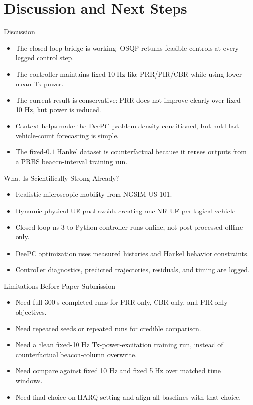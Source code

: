 \documentclass[aspectratio=1610,10pt]{beamer}
\begin{document}
\section{Discussion and Next Steps}

\begin{frame}{Discussion}
  \begin{itemize}
    \item The closed-loop bridge is working: OSQP returns feasible controls at every logged control step.
    \item The controller maintains fixed-10 Hz-like PRR/PIR/CBR while using lower mean Tx power.
    \item The current result is conservative: PRR does not improve clearly over fixed 10 Hz, but power is reduced.
    \item Context helps make the DeePC problem density-conditioned, but hold-last vehicle-count forecasting is simple.
    \item The fixed-$0.1$ Hankel dataset is counterfactual because it reuses outputs from a PRBS beacon-interval training run.
  \end{itemize}
\end{frame}

\begin{frame}{What Is Scientifically Strong Already?}
  \begin{itemize}
    \item Realistic microscopic mobility from NGSIM US-101.
    \item Dynamic physical-UE pool avoids creating one NR UE per logical vehicle.
    \item Closed-loop ns-3-to-Python controller runs online, not post-processed offline only.
    \item DeePC optimization uses measured histories and Hankel behavior constraints.
    \item Controller diagnostics, predicted trajectories, residuals, and timing are logged.
  \end{itemize}
\end{frame}

\begin{frame}{Limitations Before Paper Submission}
  \begin{itemize}
    \item Need full 300 s completed runs for PRR-only, CBR-only, and PIR-only objectives.
    \item Need repeated seeds or repeated runs for credible comparison.
    \item Need a clean fixed-10 Hz Tx-power-excitation training run, instead of counterfactual beacon-column overwrite.
    \item Need compare against fixed 10 Hz and fixed 5 Hz over matched time windows.
    \item Need final choice on HARQ setting and align all baselines with that choice.
  \end{itemize}
\end{frame}
\end{document}
